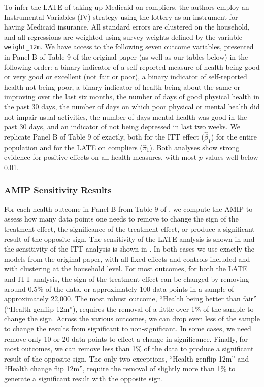 To infer the LATE of taking up Medicaid on compliers, the authors employ an
Instrumental Variables (IV) strategy using the lottery as an instrument for
having Medicaid insurance. All standard errors are clustered on the household,
and all regressions are weighted using survey weights defined by the variable
\texttt{weight\_12m}. We have access to the following seven outcome variables,
presented in Panel B of Table 9 of the original paper (as well as our tables
below) in the following order: a binary indicator of a self-reported measure of
health being good or very good or excellent (not fair or poor), a binary
indicator of self-reported health not being poor, a binary indicator of health
being about the same or improving over the last six months, the number of days
of good physical health in the past 30 days, the number of days on which poor
physical or mental health did not impair usual activities, the number of days
mental health was good in the past 30 days, and an indicator of not being
depressed in last two weeks. We replicate Panel B of Table 9 of
\citet{finkelstein2012oregon} exactly, both for the ITT effect ($\hat{\beta}_1$)
for the entire population and for the LATE on compliers ($\hat{\pi}_1$). Both
analyses show strong evidence for positive effects on all health measures, with
most $p$ values well below 0.01.

\subsubsection{AMIP Sensitivity Results}

\OHIEResultsTable{}

For each health outcome in Panel B from Table 9 of
\citet{finkelstein2012oregon}, we compute the AMIP to assess how many data
points one needs to remove to change the sign of the treatment effect, the
significance of the treatment effect, or produce a significant result of the
opposite sign. The sensitivity of the LATE analysis is shown in
 and the sensitivity of the ITT analysis is
shown in . In both cases we use exactly the
models from the original paper, with all fixed effects and controls included and
with clustering at the household level. For most outcomes, for both the LATE and
ITT analysis, the sign of the treatment effect can be changed by removing around
0.5\% of the data, or approximately 100 data points in a sample of approximately
22,000. The most robust outcome, ``Health being better than fair'' (``Health
genflip 12m''), requires the removal of a little over 1\% of the sample to
change the sign. Across the various outcomes, we can drop even less of the
sample to change the results from significant to non-significant. In some cases,
we need remove only 10 or 20 data points to effect a change in significance.
Finally, for most outcomes, we can remove less than 1\% of the data to produce a
significant result of the opposite sign. The only two exceptions, ``Health
genflip 12m'' and ``Health change flip 12m'', require the removal of slightly
more than 1\% to generate a significant result with the opposite sign.

